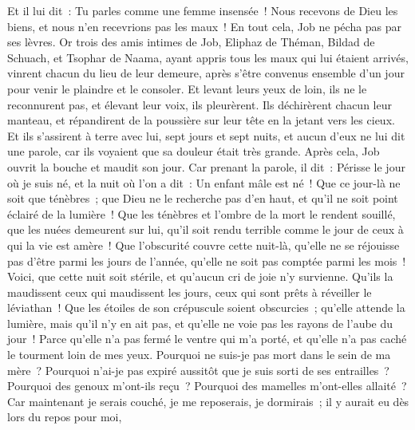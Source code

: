 \begin{multicols}{2}
Et il lui dit~: Tu parles comme une femme insensée~! Nous recevons de Dieu les biens, et nous n'en recevrions pas les maux~! En tout cela, Job ne pécha pas par ses lèvres.
Or trois des amis intimes de Job, Eliphaz de Théman, Bildad de Schuach, et Tsophar de Naama, ayant appris tous les maux qui lui étaient arrivés, vinrent chacun du lieu de leur demeure, après s'être convenus ensemble d'un jour pour venir le plaindre et le consoler.
Et levant leurs yeux de loin, ils ne le reconnurent pas, et élevant leur voix, ils pleurèrent. Ils déchirèrent chacun leur manteau, et répandirent de la poussière sur leur tête en la jetant vers les cieux.
Et ils s'assirent à terre avec lui, sept jours et sept nuits, et aucun d'eux ne lui dit une parole, car ils voyaient que sa douleur était très grande.
\VerseOne{}Après cela, Job ouvrit la bouche et maudit son jour.
Car prenant la parole, il dit~:
Périsse le jour où je suis né, et la nuit où l'on a dit~: Un enfant mâle est né~!
Que ce jour-là ne soit que ténèbres~; que Dieu ne le recherche pas d'en haut, et qu'il ne soit point éclairé de la lumière~!
Que les ténèbres et l'ombre de la mort le rendent souillé, que les nuées demeurent sur lui, qu'il soit rendu terrible comme le jour de ceux à qui la vie est amère~!
Que l'obscurité couvre cette nuit-là, qu'elle ne se réjouisse pas d'être parmi les jours de l'année, qu'elle ne soit pas comptée parmi les mois~!
Voici, que cette nuit soit stérile, et qu'aucun cri de joie n'y survienne.
Qu'ils la maudissent ceux qui maudissent les jours, ceux qui sont prêts à réveiller le léviathan~!
Que les étoiles de son crépuscule soient obscurcies~; qu'elle attende la lumière, mais qu'il n'y en ait pas, et qu'elle ne voie pas les rayons de l'aube du jour~!
Parce qu'elle n'a pas fermé le ventre qui m'a porté, et qu'elle n'a pas caché le tourment loin de mes yeux.
Pourquoi ne suis-je pas mort dans le sein de ma mère~? Pourquoi n'ai-je pas expiré aussitôt que je suis sorti de ses entrailles~?
Pourquoi des genoux m'ont-ils reçu~? Pourquoi des mamelles m'ont-elles allaité~?
Car maintenant je serais couché, je me reposerais, je dormirais~; il y aurait eu dès lors du repos pour moi,

\end{multicols}
